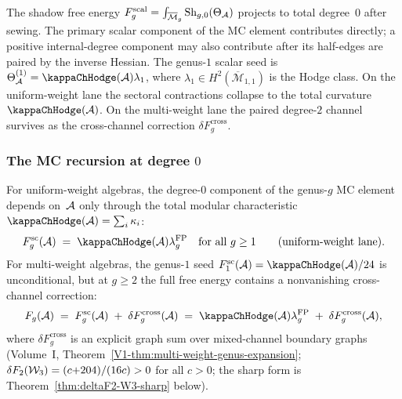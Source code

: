 \begin{remark}
\label{rem:degree-0-projection}
The shadow free energy $F_g^{\mathrm{scal}} =
\int_{\overline{\mathcal{M}}_g} \mathrm{Sh}_{g,0}(\Theta_{\mathcal{A}})$ projects
to total degree~$0$ after sewing. The primary scalar component of
the MC element contributes directly; a positive internal-degree
component may also contribute after its half-edges are paired by the
inverse Hessian. The genus-$1$ scalar seed is
$\Theta^{(1)}_\cA=\kappaChHodge(\cA)\lambda_1$, where
\(\lambda_1\in H^2(\overline{\mathcal{M}}_{1,1})\) is the Hodge
class. On the uniform-weight lane the sectoral contractions collapse
to the total curvature $\kappaChHodge(\cA)$. On the multi-weight lane
the paired degree-$2$ channel survives as the cross-channel correction
$\delta F_g^{\mathrm{cross}}$.
\end{remark}

\subsubsection{The MC recursion at degree $0$}

\begin{proposition}
\label{prop:degree-0-weight-independence}
For uniform-weight algebras, the degree-$0$ component of the
genus-$g$ MC element depends on~$\mathcal{A}$ only through the total
modular characteristic $\kappaChHodge(\cA) = \sum_i \kappa_i$:
\begin{equation}\label{eq:Fg-scalar-factorization}
F_g^{\mathrm{sc}}(\cA) \;=\; \kappaChHodge(\cA)\lambda_g^{\mathrm{FP}}
\quad\text{for all } g \geq 1
\qquad\textup{(uniform-weight lane)}.
\end{equation}
For multi-weight algebras, the genus-$1$ seed
$F_1^{\mathrm{sc}}(\cA)=\kappaChHodge(\cA)/24$ is unconditional, but at
$g \geq 2$ the full free energy contains a nonvanishing
cross-channel correction:
\begin{equation}\label{eq:Fg-cross-channel-decomposition}
F_g(\cA) \;=\; F_g^{\mathrm{sc}}(\cA)
\;+\; \delta F_g^{\mathrm{cross}}(\cA)
\;=\; \kappaChHodge(\cA)\lambda_g^{\mathrm{FP}}
\;+\;\delta F_g^{\mathrm{cross}}(\cA),
\end{equation}
where $\delta F_g^{\mathrm{cross}}$ is an explicit graph sum
over mixed-channel boundary graphs
\textup{(}Volume~I, Theorem~\textup{\ref*{V1-thm:multi-weight-genus-expansion}};
$\delta F_2(\mathcal{W}_3) = (c{+}204)/(16c) > 0$
for all $c > 0$; the sharp form is
Theorem~\ref{thm:deltaF2-W3-sharp} below\textup{)}.
\end{proposition}

